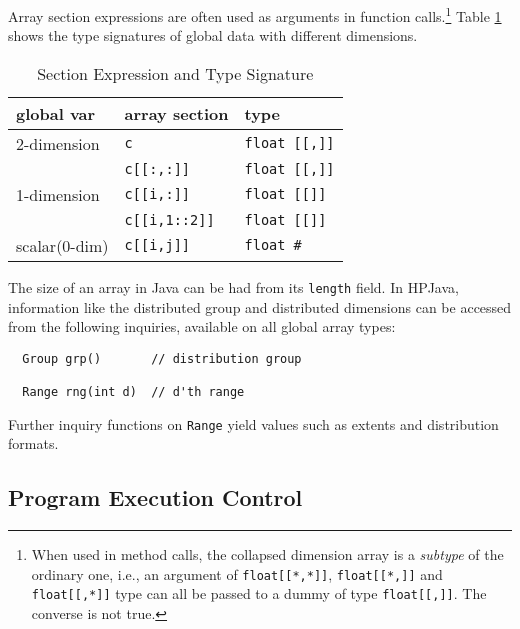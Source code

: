 Array section expressions are often used as arguments in function
calls.\footnote{When used in method calls, the collapsed dimension
array is a \emph{subtype} of the ordinary one, i.e., an argument of
\texttt{float[[*,*]]}, \texttt{float[[*,]]} and \texttt{float[[,*]]}
type can all be passed to a dummy of type \texttt{float[[,]]}.
The converse is not true.}  Table \ref{tab:section} shows the type
signatures of global data with different dimensions.

\begin{table}[tbp]
  \begin{center}
    \caption{Section Expression and Type Signature}
    \vspace{0.1in}
    \leavevmode
    \small
    \begin{tabular}[c]{|l|ll|} 
      \hline
      \textbf{global var}& \textbf{array section} & \textbf{type} \\ 
      \hline
      2-dimension & \texttt{c} & \texttt{float [[,]]} \\ 
      & \texttt{c[[:,:]]} & \texttt{float [[,]]} \\ 
      \hline
      1-dimension & \texttt{c[[i,:]]} & \texttt{float [[]]} \\ 
      & \texttt{c[[i,1::2]]} & \texttt{float [[]]} \\ 
      \hline
      scalar(0-dim) & \texttt{c[[i,j]]} & \texttt{float \#} \\ 
      \hline
    \end{tabular}
    \normalsize
    \label{tab:section}
  \end{center}
\end{table}

The size of an array in Java can be had from its
\texttt{length} field.  In HPJava, information like the
distributed group and distributed dimensions can be accessed from the
following inquiries, available on all global array types:
\small
\begin{verbatim}
  Group grp()       // distribution group

  Range rng(int d)  // d'th range
\end{verbatim}
\normalsize
Further inquiry functions on {\tt Range} yield values such as
extents and distribution formats.

\subsection{Program Execution Control}
\label{control}

